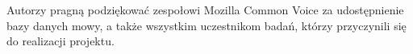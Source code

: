 Autorzy pragną podziękować zespołowi Mozilla Common Voice za udostępnienie bazy danych mowy, a także wszystkim uczestnikom badań, którzy przyczynili się do realizacji projektu.

